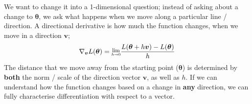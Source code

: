 \documentclass[a4paper, 12pt]{article}
\newcommand{\limit}[2]{\raisebox{0.5ex}{\scalebox{0.8}{$\displaystyle{\lim_{#1 \to #2}}$}}}
\renewcommand{\vec}[1]{\boldsymbol{#1}}
\begin{document}
            We want to change it into a 1-dimensional question; instead of asking about a change to $\vec{\theta}$, we ask what happens when we move along a particular line / direction.
            A directional derivative is how much the function changes, when we move in a direction $\vec{v}$;
            $$\nabla_{\vec{v}}L(\vec{\theta}) = \limit{h}{0}\frac{L(\vec{\theta} + h\vec{v}) - L(\vec{\theta})}{h}$$ %
            The distance that we move away from the starting point ($\vec{\theta}$) is determined by \textbf{both} the norm / scale of the direction vector $\vec{v}$, as well as $h$.
            If we can understand how the function changes based on a change in \textbf{any} direction, we can fully characterise differentiation with respect to a vector.
            \medskip
\end{document}
